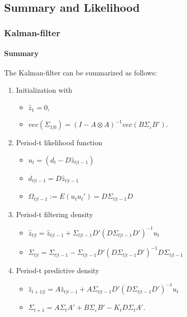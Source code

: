 \documentclass[handout]{beamer}  %
\begin{document}
\subsection{Summary and Likelihood}
\begin{frame}[shrink]\frametitle{Kalman-filter}\framesubtitle{Summary}
	The Kalman-filter can be summarized as follows:
	\begin{enumerate}
		\item Initialization with
		\begin{itemize}
			\item ${\widehat{z}_1} = {0}$,
			\item $vec({\Sigma_{1|0}}) = ({I}-{A}
			\otimes {A})^{-1} vec({B} {\Sigma_\varepsilon}
			{B}')$.
		\end{itemize}
		\item Period-t likelihood function
		\begin{itemize}
			\item $u_t = ({d_t} - D{\widehat{z}_{t|t-1}})$
			\item $d_{t|t-1} = D \widehat{z}_{t|t-1}$
			\item $\Omega_{t|t-1}:= E(u_t u_t')=D\Sigma_{t|t-1}D$
		\end{itemize}
		\item Period-t filtering density
		\begin{itemize}
			\item ${\widehat{z}_{t|t}}= {\widehat{z}_{t|t-1}}+ {\Sigma_{t|t-1}} {D'} \left({D}{\Sigma_{t|t-1}}{D'}\right)^{-1} {u_t}$
			\item $\Sigma_{t|t}= \Sigma_{t|t-1} - \Sigma_{t|t-1}D' \left({D}{\Sigma_{t|t-1}}{D'}\right)^{-1} D \Sigma_{t|t-1}$
		\end{itemize}
		\item Period-t predictive density
		\begin{itemize}
			\item ${\widehat{z}_{t+1|t}}  ={A} {\widehat{z}_{t|t-1}}+ {A}{\Sigma_{t|t-1}} {D'} \left({D}{\Sigma_{t|t-1}}{D'}\right)^{-1} {u_t}$
			\item ${\Sigma_{t+1}} = {A}
			{\Sigma_{t}} {A'} + {B} {\Sigma_\varepsilon}
			{B}' - {K_t} {D}
			{\Sigma_{t}}{A}'$.
		\end{itemize}
	\end{enumerate}
\end{frame}
\end{document}
